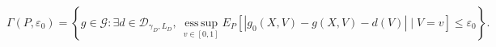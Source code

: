 \[
 \Gamma(P,\varepsilon_0)=
 \left\{g\in\mathcal G:\exists d\in\mathcal D_{\gamma_D,L_D},\
 \operatorname*{ess\,sup}_{v\in[0,1]}
 E_P[|g_0(X,V)-g(X,V)-d(V)|\mid V=v]\le\varepsilon_0\right\}.
\]
